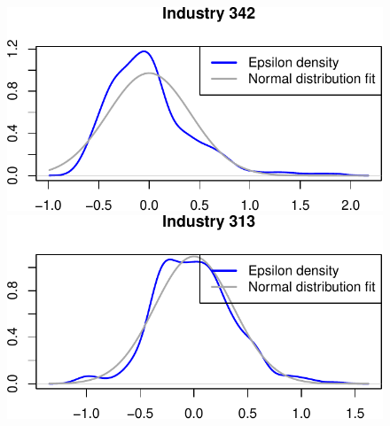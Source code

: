 \documentclass[
  12pt]{article}
\theoremstyle{definition}
\theoremstyle{remark}
\begin{document}
\begin{figure}
\begin{minipage}{\linewidth}
\includegraphics{Tax-Prod_files/figure-pdf/unnamed-chunk-63-4.pdf}

\includegraphics{Tax-Prod_files/figure-pdf/unnamed-chunk-63-5.pdf}

\end{minipage}%

\end{figure}%
\end{document}
